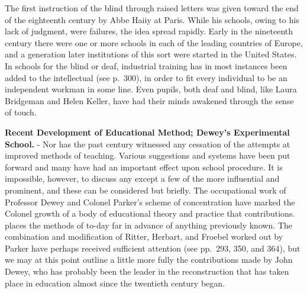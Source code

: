 \documentclass[
]{book}
\begin{document}
The first instruction of the blind through raised letters was given toward the end of the eighteenth century by Abbe Haiiy at Paris. While his schools, owing to his lack of judgment, were failures, the idea spread rapidly. Early in the nineteenth century there were one or more schools in each of the leading countries of Europe, and a generation later institutions of this sort were started in the United States. In schools for the blind or deaf, industrial training has in most instances been added to the intellectual (see p.~300), in order to fit every individual to be an independent workman in some line. Even pupils, both deaf and blind, like Laura Bridgeman and Helen Keller, have had their minds awakened through the sense of touch.

\textbf{Recent Development of Educational Method; Dewey's Experimental School.} - Nor has the past century witnessed any cessation of the attempts at improved methods of teaching. Various suggestions and systems have been put forward and many have had an important effect upon school procedure. It is impossible, however, to discuss any except a few of the more influential and prominent, and these can be considered but briefly. The occupational work of Professor Dewey and Colonel Parker's scheme of concentration have marked the Colonel growth of a body of educational theory and practice that contributions. places the methods of to-day far in advance of anything previously known. The combination and modification of Ritter, Herbart, and Froebel worked out by Parker have perhaps received sufficient attention (see pp.~293, 350, and 364), but we may at this point outline a little more fully the contributions made by John Dewey, who has probably been the leader in the reconstruction that has taken place in education almost since the twentieth century began.
\end{document}
